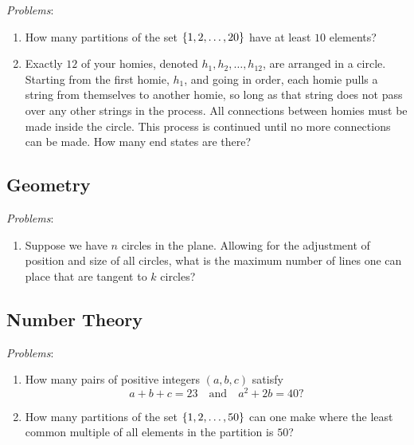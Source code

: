 \textit{Problems}: 
\begin{enumerate}
    \item How many partitions of the set \( \left\{ 1, 2, \ldots, 20 \right\} \) have at
        least \( 10 \) elements?

    \item Exactly \( 12 \) of your homies,  denoted \( h_1, h_2,\ldots,
        h_{12} \), are arranged in a circle. Starting from the first homie, \(
        h_1 \), and going in order, each homie pulls a string from themselves
        to another homie, so long as that string does not pass over any other
        strings in the process. All connections between homies must be made
        inside the circle. This process is continued until no more connections
        can be made. How many end states are there?
\end{enumerate}

\subsection{Geometry}

\textit{Problems}: 
\begin{enumerate}
    \item Suppose we have \( n \) circles in the plane.  Allowing for the adjustment of position and size of all circles, what is
        the maximum number of lines one can place that are tangent to \( k \) circles?
\end{enumerate}

\subsection{Number Theory}

\textit{Problems}: 
\begin{enumerate}
    \item How many pairs of positive integers \( \left( a, b, c \right) \) satisfy
        \[
            a + b + c = 23 \quad \text{and} \quad a^2 + 2b = 40
        ?\]

    \item How many partitions of the set \( \left\{ 1, 2, \ldots, 50 \right\} \) can one
        make where the least common multiple of all elements in the partition
        is \( 50 \)?
\end{enumerate}

